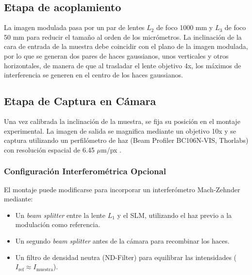 \subsection{Etapa de acoplamiento}
La imagen modulada pasa por un par de lentes $L_2$ de foco 1000 mm y $L_3$ de foco 50 mm para reducir el tamaño al orden de los micrómetros. La inclinación de la cara de entrada de la muestra debe coincidir con el plano de la imagen modulada, por lo que se generan dos pares de haces gaussianos, unos verticales y otros horizontales, de manera de que al trasladar el lente objetivo 4x, los máximos de interferencia se generen en el centro de los haces gaussianos.

\subsection{Etapa de Captura en Cámara}
Una vez calibrada la inclinación de la muestra, se fija su posición en el montaje experimental. La imagen de salida se magnifica mediante un objetivo 10x y se captura utilizando un perfilómetro de haz (Beam Profiler BC106N-VIS, Thorlabs) con resolución espacial de 6.45 $\mu$m/px \citep{thorlabs_beam_profiler}.

\subsubsection{Configuración Interferométrica Opcional}
El montaje puede modificarse para incorporar un interferómetro Mach-Zehnder mediante:
\begin{itemize}
	\item Un \textit{beam splitter} entre la lente $L_1$ y el SLM, utilizando el haz previo a la modulación como referencia.
	\item Un segundo \textit{beam splitter} antes de la cámara para recombinar los haces.
	\item Un filtro de densidad neutra (ND-Filter) para equilibrar las intensidades ($I_{\text{ref}} \approx I_{\text{muestra}}$).
\end{itemize}

